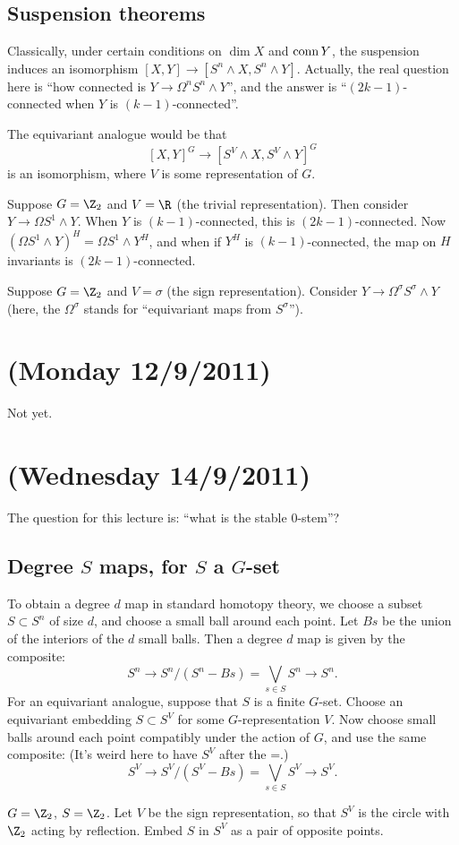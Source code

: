 \documentclass[11pt]{article}
\newcommand{\bluenote}[1]{{\color{blue}#1}\scalebox{.1}{rednote}}
\newcommand{\NewLecture}[3]{\section{#1 {\small(#2/#3/2011)}}}
\begin{document}
\subsection*{Suspension theorems}
Classically, under certain conditions on $\dim X$ and $\operatorname{conn} Y$, the suspension induces an isomorphism $[X,Y]\to[S^n\wedge X,S^n\wedge Y]$. Actually, the real question here is ``how connected is $Y\to \Omega^nS^n\wedge Y$'', and the answer is ``$(2k-1)$-connected when $Y$ is $(k-1)$-connected''.

The equivariant analogue would be that
\[[X,Y]^G\to [S^V\wedge X,S^V\wedge Y]^G\]
is an isomorphism, where $V$ is some representation of $G$.
\begin{exmp*}
Suppose $G=\Z_2$ and $V=\R$ (the trivial representation). Then consider $Y\to\Omega S^1\wedge Y$. When $Y$ is $(k-1)$-connected, this is $(2k-1)$-connected.
Now $(\Omega S^1\wedge Y)^H=\Omega S^1\wedge Y^H$, and when if $Y^H$ is $(k-1)$-connected, the map on $H$ invariants is $(2k-1)$-connected.
\end{exmp*}
\begin{exmp*}
Suppose $G=\Z_2$ and $V=\sigma$ (the sign representation). Consider $Y\to \Omega^\sigma S^\sigma\wedge Y$ (here, the $\Omega^\sigma$ stands for ``equivariant maps from $S^\sigma$'').
\end{exmp*}
\NewLecture{}{Monday 12}{9} Not yet.
\NewLecture{}{Wednesday 14}{9}
The question for this lecture is: ``what is the stable $0$-stem''?
\subsection*{Degree $S$ maps, for $S$ a $G$-set}
To obtain a degree $d$ map in standard homotopy theory, we choose a subset $S\subset S^n$ of size $d$, and choose a small ball around each point. Let $Bs$ be the union of the interiors of the $d$ small balls. Then a degree $d$ map is given by the composite:
\[S^n\to S^n/(S^n-Bs)=\textstyle{\bigvee}_{\!s\in S}S^n\to S^n.\]
For an equivariant analogue, suppose that $S$ is a finite $G$-set. Choose an equivariant embedding $S\subset S^V$ for some $G$-representation $V$. Now choose small balls around each point compatibly under the action of $G$, and use the same composite: \bluenote{(It's weird here to have $S^V$ after the =.)}
\[S^V\to S^V/(S^V-Bs)=\textstyle{\bigvee}_{\!s\in S}S^V\to S^V.\]
\begin{exmp*}
$G=\Z_2$, $S=\Z_2$. Let $V$ be the sign representation, so that $S^V$ is the circle with $\Z_2$ acting by reflection. Embed $S$ in $S^V$ as a pair of opposite points.
\end{exmp*}
\end{document}
